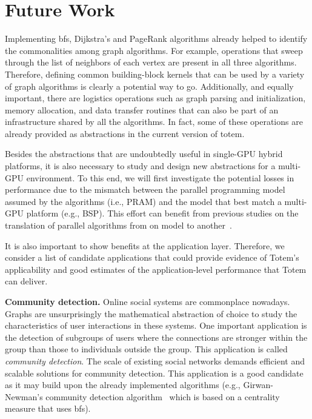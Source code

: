 \section{Future Work}
\label{sec:future}

Implementing {\sc bfs}, Dijkstra's and PageRank algorithms already helped to identify the commonalities among graph algorithms. For example, operations that sweep through the list of neighbors of each vertex are present in all three algorithms. Therefore, defining common building-block kernels that can be used by a variety of graph algorithms is clearly a potential way to go. Additionally, and equally important, there are logistics operations such as graph parsing and initialization, memory allocation, and data transfer routines that can also be part of an infrastructure shared by all the algorithms. In fact, some of these operations are already provided as abstractions in the current version of {\sc totem}.

Besides the abstractions that are undoubtedly useful in single-GPU hybrid platforms, it is also necessary to study and design new abstractions for a multi-GPU environment. To this end, we will first investigate the potential losses in performance due to the mismatch between the parallel programming model assumed by the algorithms (i.e., PRAM) and the model that best match a multi-GPU platform (e.g., BSP). This effort can benefit from previous studies on the translation of parallel algorithms from on model to another~\cite{Gerbessiotis92}. 

It is also important to show benefits at the application layer. Therefore, we consider a list of candidate applications that could provide evidence of {\sc Totem}'s applicability and good estimates of the application-level performance that {\sc Totem} can deliver. 

{\bf Community detection.} Online social systems are commonplace nowadays. Graphs are unsurprisingly the mathematical abstraction of choice to study the characteristics of user interactions in these systems. One important application is the detection of subgroups of users where the connections are stronger within the group than those to individuals outside the group. This application is called {\em community detection}. The scale of existing social networks demands efficient and scalable solutions for community detection. This application is a good candidate as it may build upon the already implemented algorithms (e.g., Girwan-Newman's community detection algorithm~\cite{Newman2004} which is based on a centrality measure that uses {\sc bfs}).

